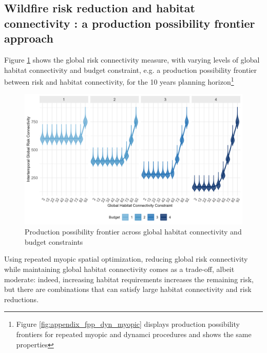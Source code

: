 \FloatBarrier

\subsection{Wildfire risk reduction and habitat connectivity : a production possibility frontier approach}

Figure \ref{fig:frontier} shows the global risk connectivity measure, with varying levels of global habitat connectivity and budget constraint, e.g. a production possibility frontier between risk and habitat connectivity, for the 10 years planning horizon\footnote{Figure \ref{fig:appendix_fpp_dyn_myopic} displays production possibility frontiers for repeated myopic and dynamci procedures and shows the same properties}

\begin{figure}[h]
    \centering
    \includegraphics[width = .8\textwidth]{figures/wildland/fpp.jpg}
    \caption{Production possibility frontier across global habitat connectivity and budget constraints}
    \label{fig:frontier}
\end{figure}

Using repeated myopic spatial optimization, reducing global risk connectivity while maintaining global habitat connectivity comes as a trade-off, albeit moderate: indeed, increasing habitat requirements increases the remaining risk, but there are combinations that can satisfy large habitat connectivity and risk reductions. 

